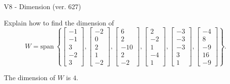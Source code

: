 \begin{exercise}
  \begin{exerciseTitle}V8 - Dimension (ver. 627)\end{exerciseTitle}
  \begin{exerciseStatement}
    Explain how to find the dimension of 
\[W=\mathrm{span}\ \left\{\left[\begin{array}{r}
-1 \\
-1 \\
3 \\
-2 \\
3
\end{array}\right] , \left[\begin{array}{r}
-2 \\
0 \\
2 \\
1 \\
-2
\end{array}\right] , \left[\begin{array}{r}
6 \\
2 \\
-10 \\
2 \\
-2
\end{array}\right] , \left[\begin{array}{r}
2 \\
-2 \\
1 \\
-4 \\
1
\end{array}\right] , \left[\begin{array}{r}
-3 \\
-3 \\
-3 \\
3 \\
1
\end{array}\right] , \left[\begin{array}{r}
-4 \\
8 \\
-9 \\
16 \\
-9
\end{array}\right]\right\}.\]



  \end{exerciseStatement}
  \begin{exerciseAnswer}
   The dimension of \(W\) is  \(4\).
  


  \end{exerciseAnswer}
\end{exercise}